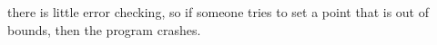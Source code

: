 
\begin{DoxyRefList}
\item[\label{bug__bug000001}%
\Hypertarget{bug__bug000001}%
File \hyperlink{gl_8c}{gl.c} ]there is little error checking, so if someone tries to set a point that is out of bounds, then the program crashes.  
\item[\label{bug__bug000002}%
\Hypertarget{bug__bug000002}%
File \hyperlink{life_8c}{life.c} ]
\end{DoxyRefList}